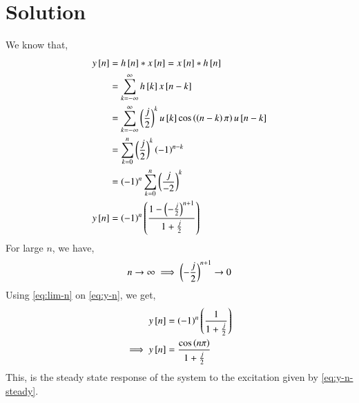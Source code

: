 \documentclass[journal,12pt,twocolumn]{IEEEtran}
\begin{document}
\section{Solution}
\noindent We know that,
\begin{align}
	y{}\left[n\right] &= h{}\left[n\right] * x{}\left[n\right] = x{}\left[n\right] * h{}\left[n\right] \nonumber \\
		&= \sum_{k=-\infty}^{\infty} h{}\left[k\right] x{}\left[n-k\right] \nonumber \\
		&= \sum_{k=-\infty}^{\infty} \left(\frac{j}{2}\right)^{k} u{}\left[k\right] \cos\left(\left(n-k\right)\pi\right) u{}\left[n-k\right] \nonumber \\
		&= \sum_{k=0}^{n} \left(\frac{j}{2}\right)^k \left(-1\right)^{n-k} \nonumber \\
		&= \left(-1\right)^n \sum_{k=0}^{n} \left(\frac{j}{-2}\right)^k \nonumber \\
	y{}\left[n\right] &= \left(-1\right)^n \left( \frac{1-\left(-\frac{j}{2}\right)^{n+1}}{1+\frac{j}{2}} \right) \label{eq:y-n}
\end{align}
For large $n$, we have,
\begin{align}
	n \to \infty \implies \left(-\frac{j}{2}\right)^{n+1} \to 0
	\label{eq:lim-n}
\end{align}
Using \eqref{eq:lim-n} on \eqref{eq:y-n}, we get,
\begin{align}
	y{}\left[n\right] &= \left(-1\right)^n \left( \frac{1}{1+\frac{j}{2}} \right) \nonumber \\
	\implies y{}\left[n\right] &= \frac{\cos\left(n\pi\right)}{1 + \frac{j}{2}} \label{eq:y-n-steady}
\end{align}
This, is the steady state response of the system to the excitation given by \eqref{eq:y-n-steady}.
\end{document}
